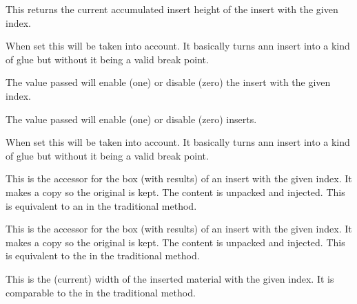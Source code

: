 \stopnewprimitive

\startnewprimitive[title={\prm {insertprogress}}]

This returns the current accumulated insert height of the insert with the given
index.

\stopnewprimitive

\startnewprimitive[title={\prm {insertshrink}}]

When set this will be taken into account. It basically turns ann insert into a
kind of glue but without it being a valid break point.

\stopnewprimitive

\startnewprimitive[title={\prm {insertstorage}}]

The value passed will enable (one) or disable (zero) the insert with the given
index.

\stopnewprimitive

\startnewprimitive[title={\prm {insertstoring}}]

The value passed will enable (one) or disable (zero) inserts.

\stopnewprimitive

\startnewprimitive[title={\prm {insertstretch}}]

When set this will be taken into account. It basically turns ann insert into a
kind of glue but without it being a valid break point.

\stopnewprimitive

\startnewprimitive[title={\prm {insertunbox}}]

This is the accessor for the box (with results) of an insert with the given
index. It makes a copy so the original is kept. The content is unpacked and
injected. This is equivalent to an  in the traditional method.

\stopnewprimitive

\startnewprimitive[title={\prm {insertuncopy}}]

This is the accessor for the box (with results) of an insert with the given
index. It makes a copy so the original is kept. The content is unpacked and
injected. This is equivalent to the  in the traditional method.

\stopnewprimitive

\startnewprimitive[title={\prm {insertwidth}}]

This is the (current) width of the inserted material with the given index. It is
comparable to the  in the traditional method.

